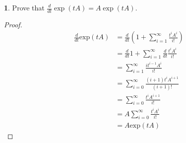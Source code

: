 \documentclass[12pt]{article}
\theoremstyle{definition}
\newtheorem{ex}{}
\begin{document}
\begin{ex}
	Prove that $\frac{d}{dt}\exp(tA) = A\exp(tA)$.
\end{ex}
\begin{proof}
	\begin{align*}
		\frac{d}{dt}\mathrm{exp}(tA) & = \frac{d}{dt} \left(1 + \sum_{i=1}^\infty \frac{t^iA^i}{i!}\right) \\
		                             & = \frac{d}{dt}1 + \sum_{i=1}^\infty \frac{d}{dt}\frac{t^iA^i}{i!}   \\
		                             & = \sum_{i=1}^\infty \frac{it^{i-1}A^i}{i!}                          \\
		                             & = \sum_{i=0}^\infty \frac{(i+1)t^iA^{i+1}}{(i+1)!}                  \\
		                             & = \sum_{i=0}^\infty \frac{t^iA^{i+1}}{i!}                           \\
		                             & = A\sum_{i=0}^\infty \frac{t^iA^{i}}{i!}                            \\
		                             & = A\mathrm{exp}(tA)
	\end{align*}
\end{proof}
\end{document}
